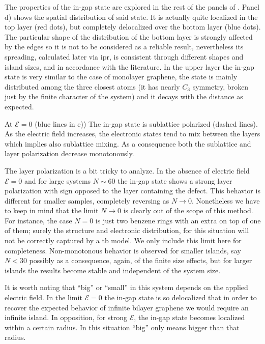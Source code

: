 The properties of the in-gap state are explored in the rest of the panels of . Panel d) shows the spatial distribution of said state. It is actually quite localized in the top layer (red dots), but completely delocalized over the bottom layer (blue dots).
The particular shape of the distribution of the bottom layer is strongly affected by the edges so it is not to be considered as a reliable result, nevertheless its spreading, calculated later via \ac{ipr}, is consistent through different shapes and island sizes, and in accordance with the literature\cite{Castro2010}.
In the upper layer the in-gap state is very similar to the case of monolayer graphene, the state is mainly distributed among the three closest atoms (it has nearly $C_3$ symmetry, broken just by the finite character of the system) and it decays with the distance as expected.

At $\mathcal{E}=0$ (blue lines in e)) The in-gap state is sublattice polarized (dashed lines). As the electric field increases, the electronic states tend to mix between the layers which implies also sublattice mixing. As a consequence both the sublattice and layer polarization decrease monotonously.

The layer polarization is a bit tricky to analyze. In the absence of electric field $\mathcal{E}=0$ and for large systems $N\sim60$ the in-gap state shows a strong layer polarization with sign opposed to the layer containing the defect. This behavior is different for smaller samples, completely reversing as $N\to0$. Nonetheless we have to keep in mind that the limit $N\to0$ is clearly out of the scope of this method. For instance, the case $N=0$ is just two benzene rings with an extra  on top of one of them; surely the structure and electronic distribution, for this situation will not be correctly captured by a \ac{tb} model. We only include this limit here for completeness.
Non-monotonous behavior is observed for smaller islands, say $N<30$ possibly as a consequence, again, of the finite size effects, but for larger islands the results become stable and independent of the system size.

It is worth noting that ``big'' or ``small'' in this system depends on the applied electric field. In the limit $\mathcal{E}=0$ the in-gap state is so delocalized that in order to recover the expected behavior of infinite bilayer graphene we would require an infinite island. In opposition, for strong $\mathcal{E}$, the in-gap state becomes localized within a certain radius. In this situation ``big'' only means bigger than that radius.


